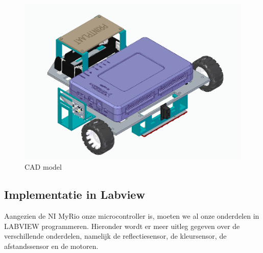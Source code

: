 \documentclass[kulak]{kulakarticle} %
\begin{document}
\begin{figure}[h]
	\centering
	\includegraphics[width=.8\textwidth]{ChassisDEF}
	\caption{CAD model}
	\label{fig:chassis2}
\end{figure}

\subsection{Implementatie in Labview}
Aangezien de NI MyRio onze microcontroller is, moeten we al onze onderdelen in LABVIEW programmeren. Hieronder wordt er meer uitleg gegeven over de verschillende onderdelen, namelijk de reflectiesensor, de kleursensor, de afstandssensor en de motoren.
\end{document}
